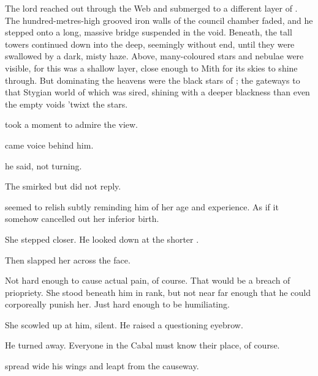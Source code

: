 The \resphan{} lord reached out through the Web and submerged to a different layer of \Nyx. The hundred-metres-high grooved iron walls of the council chamber faded, and he stepped onto a long, massive bridge suspended in the void. Beneath, the tall towers continued down into the deep, seemingly without end, until they were swallowed by a dark, misty haze. Above, many-coloured stars and nebulae were visible, for this was a shallow layer, close enough to Mith for its skies to shine through. But dominating the heavens were the black stars of \Erebos; the gateways to that Stygian world of which \Nyx{} was sired, shining with a deeper blackness than even the empty voids 'twixt the stars. 

\Teshrial{} took a moment to admire the view. 

 came \Achsahz{} voice behind him. 

 he said, not turning. 


 The \ketheran{} smirked but did not reply. 


 \Achsah{} seemed to relish subtly reminding him of her age and experience. As if it somehow cancelled out her inferior birth. 

 She stepped closer. He looked down at the shorter \resvil. 

Then slapped her across the face. 

Not hard enough to cause actual pain, of course. That would be a breach of priopriety. She stood beneath him in rank, but not near far enough that he could corporeally punish her. Just hard enough to be humiliating. 

 She scowled up at him, silent. He raised a questioning eyebrow. 


He turned away.  Everyone in the Cabal must know their place, of course. 


\Teshrial{} spread wide his wings and leapt from the causeway. 







